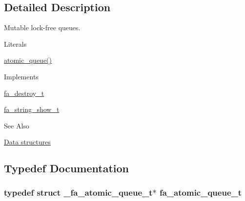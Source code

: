 \subsection{Detailed Description}
Mutable lock-\/free queues. \begin{DoxyParagraph}{Literals}

\begin{DoxyItemize}
\item {\ttfamily \hyperlink{util_8h_a1e0b7a481baccdd5493632222a87eb1c}{atomic\-\_\-queue()}}
\end{DoxyItemize}
\end{DoxyParagraph}
\begin{DoxyParagraph}{Implements }

\begin{DoxyItemize}
\item \hyperlink{structfa__destroy__t}{fa\-\_\-destroy\-\_\-t}
\item \hyperlink{structfa__string__show__t}{fa\-\_\-string\-\_\-show\-\_\-t}
\end{DoxyItemize}
\end{DoxyParagraph}
\begin{DoxySeeAlso}{See Also}

\begin{DoxyItemize}
\item \hyperlink{md__data_structures_DataStructures}{Data structures} 
\end{DoxyItemize}
\end{DoxySeeAlso}


\subsection{Typedef Documentation}
\hypertarget{group___fa_atomic_queue_ga31bf61a25a3ef94a5590f863b5448be7}{
\subsubsection[{fa\-\_\-atomic\-\_\-queue\-\_\-t}]{\setlength{\rightskip}{0pt plus 5cm}typedef struct \-\_\-fa\-\_\-atomic\-\_\-queue\-\_\-t$\ast$ {\bf fa\-\_\-atomic\-\_\-queue\-\_\-t}}}\label{group___fa_atomic_queue_ga31bf61a25a3ef94a5590f863b5448be7}


